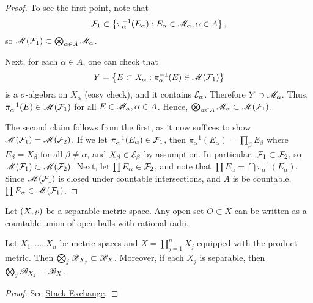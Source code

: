 \documentclass[12pt]{article} %
\begin{document}
\begin{proof}
    To see the first point, note that \[\mathcal{F}_1 \subset \left\{ \pi_{\alpha}^{-1}(E_\alpha) : E_\alpha \in \mathscr{M}_\alpha, \alpha \in A\right\},\] so $\mathscr{M}(\mathcal{F}_1) \subset \bigotimes_{\alpha \in A} \mathscr{M}_\alpha$.

    Next, for each $\alpha \in A$, one can check that \[Y = \left\{ E \subset X_\alpha : \pi_{\alpha}^{-1}(E) \in \mathscr{M}(\mathcal{F}_1) \right\}\] is a $\sigma$-algebra on $X_\alpha$ (easy check), and it contains $\mathcal{E}_\alpha$. Therefore $Y \supset \mathscr{M}_\alpha$. Thus, $\pi_{\alpha}^{-1}(E) \in \mathscr{M}(\mathcal{F}_1)$ for all $E \in \mathscr{M}_\alpha, \alpha \in A$. Hence, $\bigotimes_{\alpha \in A} \mathscr{M}_\alpha \subset \mathscr{M}(\mathcal{F}_1)$.

    The second claim follows from the first, as it now suffices to show $\mathscr{M}(\mathcal{F}_1) = \mathscr{M}(\mathcal{F}_2)$. If we let $\pi_{\alpha}^{-1}(E_\alpha) \in \mathcal{F}_1$, then $\pi_{\alpha}^{-1}(E_\alpha) = \prod_{\beta}E_\beta$ where $E_\beta = X_\beta$ for all $\beta \neq \alpha$, and $X_\beta \in \mathcal{E}_\beta$ by assumption. In particular, $\mathcal{F}_1 \subset \mathcal{F}_2$, so $\mathscr{M}(\mathcal{F}_1) \subset \mathscr{M}(\mathcal{F}_2)$. Next, let $\prod E_\alpha \in \mathcal{F}_2$, and note that $\prod E_\alpha = \bigcap \pi_{\alpha}^{-1}(E_\alpha)$. Since $\mathscr{M}(\mathcal{F}_1)$ is closed under countable intersections, and $A$ is be countable, $\prod E_\alpha \in \mathscr{M}(\mathcal{F}_1)$.
\end{proof}

\begin{lemma}
    Let $(X, \varrho)$ be a separable metric space. Any open set $O \subset X$ can be written as a countable union of open balls with rational radii.
\end{lemma}

\begin{proposition}
    Let $X_1, \ldots, X_n$ be metric spaces and $X = \prod_{j=1}^{n} X_j$ equipped with the product metric. Then $\bigotimes_{j} \mathscr{B}_{X_j} \subset \mathscr{B}_X$. Moreover, if each $X_j$ is separable, then $\bigotimes_{j} \mathscr{B}_{X_j} = \mathscr{B}_X$.
\end{proposition}

\begin{proof}
    See \href{https://math.stackexchange.com/questions/1943686/in-separable-metric-space-every-open-set-is-at-most-countable-union-of-open-ball}{Stack Exchange}.
\end{proof}
\end{document}
